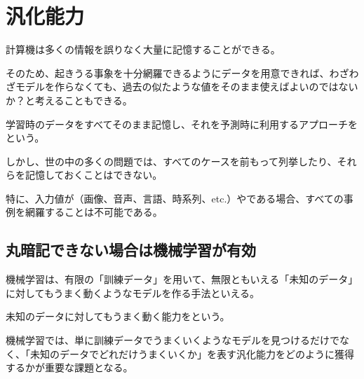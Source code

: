 \documentclass[../../../topic_machine-learning]{subfiles}
\begin{document}
\sectionline
\section{汎化能力}

計算機は多くの情報を誤りなく大量に記憶することができる。

そのため、起きうる事象を十分網羅できるようにデータを用意できれば、わざわざモデルを作らなくても、過去の似たような値をそのまま使えばよいのではないか？と考えることもできる。

\br

学習時のデータをすべてそのまま記憶し、それを予測時に利用するアプローチをという。

\br

しかし、世の中の多くの問題では、すべてのケースを前もって列挙したり、それらを記憶しておくことはできない。

特に、入力値が（画像、音声、言語、時系列、etc.）やである場合、すべての事例を網羅することは不可能である。

\subsection{丸暗記できない場合は機械学習が有効}

機械学習は、有限の「訓練データ」を用いて、無限ともいえる「未知のデータ」に対してもうまく動くようなモデルを作る手法といえる。

\br

未知のデータに対してもうまく動く能力をという。

\br

機械学習では、単に訓練データでうまくいくようなモデルを見つけるだけでなく、「未知のデータでどれだけうまくいくか」を表す汎化能力をどのように獲得するかが重要な課題となる。
\end{document}
